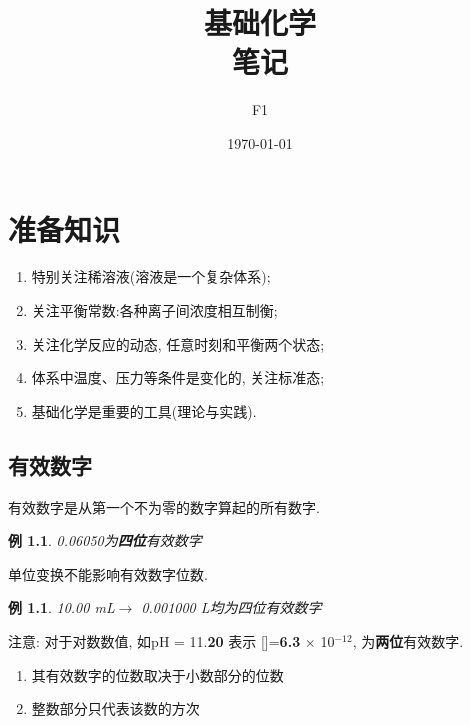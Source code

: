 \documentclass[12pt, a4paper, oneside]{ctexbook}
\title{{\Huge{\textbf{基础化学}}}\\笔记}
\author{F1}
\date{\today}
\newtheorem{example}[theorem]{例}
\newcommand{\ml}{\si{\milli\liter}}
\newcommand{\li}{\si{\liter}}
\begin{document}
\maketitle

\setcounter{page}{1}



{}
\setcounter{page}{1}
\tableofcontents
\newpage
\setcounter{page}{1}

\chapter{准备知识}
\begin{enumerate}
    \item 特别关注稀溶液(溶液是一个复杂体系);
    \item 关注平衡常数:各种离子间浓度相互制衡;
    \item 关注化学反应的动态, 任意时刻和平衡两个状态;
    \item 体系中温度、压力等条件是变化的, 关注标准态;
    \item 基础化学是重要的工具(理论与实践).
\end{enumerate}

\section*{有效数字}
有效数字是从第一个不为零的数字算起的所有数字. 
\begin{example}
    0.06050为\textbf{四位}有效数字
\end{example}
单位变换不能影响有效数字位数. 
\begin{example}
    10.00 \ml  $\to$ 0.001000 \li 均为四位有效数字
\end{example}


注意: 对于对数数值, 如pH = 11.\textbf{20} 表示 []=\textbf{6.3} $\times$ 10$^{-12}$, 为\textbf{两位}有效数字. 
\begin{enumerate}
    \item 其有效数字的位数取决于小数部分的位数
    \item 整数部分只代表该数的方次
\end{enumerate}
\end{document}
